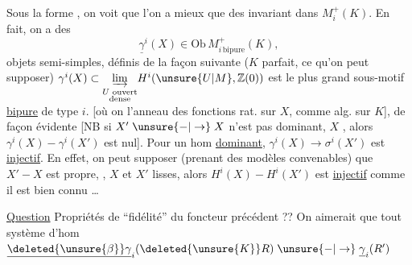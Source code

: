 Sous la forme , on voit que l'on a mieux que des invariant dans $M^+_i(K)$. En fait, on a des
\[
\underline{\gamma}^{i}(X)\in\mathrm{Ob}\, M^+_{i\,\mathrm{bipure}}(K),
\]
objets semi-simples, définis de la façon suivante ($K$ parfait, ce qu'on peut supposer) $\gamma^i(X)\subset\underset{\substack{U\text{ ouvert}\\\text{dense}}}{\underrightarrow{\lim}}H^i(\unsure{U|M},\mathbb Z(0))$ est le plus grand sous-motif \uline{bipure} de type $i$. \deleted{[\unsure{Alors|la} le quotient par $\gamma^i(X)$}  [où on l'anneau des fonctions rat. sur $X$, comme alg. sur $K$], de façon évidente
[NB si $X'\mathrel{\unsure{-|\to}}X$ n'est pas dominant, $X$ , alors $\gamma^i(X)\mathrel{-}\gamma^i(X')$ est nul]. Pour un hom \uline{dominant}, $\gamma^i(X)\longrightarrow\sigma^{i}(X')$ est \uline{injectif}. En effet, on peut supposer (prenant des modèles convenables) que $X'\mathrel{-}X$ est propre, , $X$ et $X'$ lisses, alors $H^i(X)\mathrel{-}H^i(X')$ est \uline{injectif} comme il est bien connu \dots

\uline{Question}  Propriétés de ``fidélité'' du foncteur précédent ?? On aimerait que tout  système d'hom $\underline{\deleted{\unsure{\beta}}\gamma}_i(\deleted{\unsure{K}}R)\mathrel{\unsure{-|\to}}\underline{\gamma}_i(R')$
